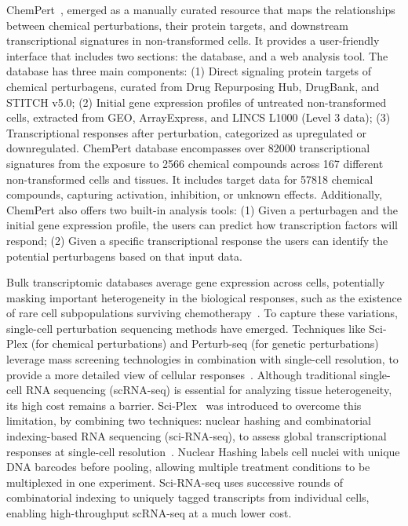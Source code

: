 ChemPert~\cite{RN86}, emerged as a manually curated resource that maps the relationships between chemical perturbations, their protein targets, and downstream transcriptional signatures in non-transformed cells. 
It provides a user-friendly interface that includes two sections: the database, and a web analysis tool. The database has three main components: 
(1) Direct signaling protein targets of chemical perturbagens, curated from Drug Repurposing Hub, DrugBank, and STITCH v5.0; 
(2) Initial gene expression profiles of untreated non-transformed cells, extracted from GEO, ArrayExpress, and LINCS L1000 (Level 3 data); 
(3) Transcriptional responses after perturbation, categorized as upregulated or downregulated. 
ChemPert database encompasses over 82000 transcriptional signatures from the exposure to 2566 chemical compounds across 167 different non-transformed cells and tissues. 
It includes target data for 57818 chemical compounds, capturing activation, inhibition, or unknown effects. 
Additionally, ChemPert also offers two built-in analysis tools: 
(1) Given a perturbagen and the initial gene expression profile, the users can predict how transcription factors will respond; 
(2) Given a specific transcriptional response the users can identify the potential perturbagens based on that input data.


Bulk transcriptomic databases average gene expression across cells, potentially masking important heterogeneity in the biological responses, such as the existence of rare cell subpopulations surviving chemotherapy~\cite{RN88}. 
To capture these variations, single-cell perturbation sequencing methods have emerged. 
Techniques like Sci-Plex (for chemical perturbations) and Perturb-seq (for genetic perturbations) leverage mass screening technologies in combination with single-cell resolution, to provide a more detailed view of cellular responses~\cite{RN97}. 
Although traditional single-cell RNA sequencing (scRNA-seq) is essential for analyzing tissue heterogeneity, its high cost remains a barrier. Sci-Plex~\cite{RN88} was introduced to overcome this limitation, by combining two techniques: 
nuclear hashing and combinatorial indexing-based RNA sequencing (sci-RNA-seq), to assess global transcriptional responses at single-cell resolution~\cite{RN125, RN126}. 
Nuclear Hashing labels cell nuclei with unique DNA barcodes before pooling, allowing multiple treatment conditions to be multiplexed in one experiment. 
Sci-RNA-seq uses successive rounds of combinatorial indexing to uniquely tagged transcripts from individual cells, enabling high-throughput scRNA-seq at a much lower cost. 


